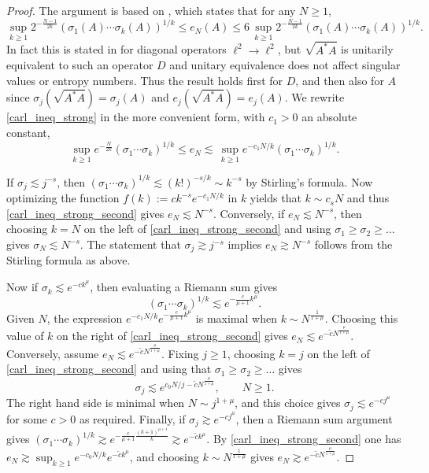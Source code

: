 \documentclass[12pt,twoside]{amsart}
\numberwithin{equation}{section}
\renewcommand{\leq}{\leqslant}
\renewcommand{\geq}{\geqslant}
\begin{document}
\begin{proof}
The argument is based on \cite[Proposition 1.3.2]{CS90}, which states that for any $N \geq 1$, 
\begin{equation} \label{carl_ineq_strong}
\sup_{k \geq 1} 2^{-\frac{N-1}{2k}} (\sigma_1(A) \cdots \sigma_k(A))^{1/k} \leq e_N(A) \leq 6 \,\sup_{k \geq 1} 2^{-\frac{N-1}{2k}} (\sigma_1(A) \cdots \sigma_k(A))^{1/k}.
\end{equation}
In fact this is stated in \cite{CS90} for diagonal operators $\ell^2 \to \ell^2$, but $\sqrt{A^* A}$ is unitarily equivalent to such an operator $D$ and unitary equivalence does not affect singular values or entropy numbers. Thus the result holds first for $D$, and then also for $A$ since $\sigma_j(\sqrt{A^* A}) = \sigma_j(A)$ and $e_j(\sqrt{A^* A}) = e_j(A)$. We rewrite \eqref{carl_ineq_strong} in the more convenient form, with $c_1 > 0$ an absolute constant, 
\begin{equation} \label{carl_ineq_strong_second}
\sup_{k \geq 1}  e^{-\frac{N}{2k}}  (\sigma_1 \cdots \sigma_k)^{1/k} \leq e_N \lesssim \,\sup_{k \geq 1} e^{-c_1 N/k} (\sigma_1 \cdots \sigma_k)^{1/k}.
\end{equation}

If $\sigma_j \lesssim j^{-s}$, then $(\sigma_1 \cdots \sigma_k)^{1/k} \lesssim (k!)^{-s/k} \sim k^{-s}$ by Stirling's formula. Now optimizing the function $f(k):= ck^{-s} e^{-c_1 N/k}$ in $k$ yields that $k \sim c_s N$ and thus \eqref{carl_ineq_strong_second} gives $e_N \lesssim N^{-s}$. Conversely, if $e_N \lesssim N^{-s}$, then choosing $k=N$ on the left of \eqref{carl_ineq_strong_second} and using $\sigma_1 \geq \sigma_2 \geq \ldots$ gives $\sigma_N \lesssim N^{-s}$. The statement that $\sigma_j \gtrsim j^{-s}$ implies $e_N \gtrsim N^{-s}$ follows from the Stirling formula as above.

Now if $\sigma_k \lesssim e^{-ck^{\mu}}$, then evaluating a Riemann sum gives 
\[
(\sigma_1 \cdots \sigma_k)^{1/k} \lesssim e^{-\frac{c}{\mu+1} k^{\mu}}.
\]
Given $N$, the expression $e^{-c_1 N/k} e^{-\frac{c}{\mu+1} k^{\mu}}$ is maximal when $k \sim N^{\frac{1}{1+\mu}}$. Choosing this value of $k$ on the right of \eqref{carl_ineq_strong_second} gives $e_N \lesssim e^{-\tilde{c} N^{\frac{\mu}{1+\mu}}}$. Conversely, assume $e_N \lesssim e^{-\tilde{c} N^{\frac{\mu}{1+\mu}}}$. Fixing $j \geq 1$, choosing $k=j$ on the left of \eqref{carl_ineq_strong_second} and using that $\sigma_1 \geq \sigma_2 \geq \ldots$  gives 
\[
\sigma_j \lesssim e^{c_0 N/j -\tilde{c} N^{\frac{\mu}{1+\mu}}}, \qquad N \geq 1.
\]
The right hand side is minimal when $N \sim j^{1+\mu}$, and this choice gives $\sigma_j \lesssim e^{-c j^{\mu}}$ for some $c > 0$ as required. Finally, if $\sigma_j \gtrsim e^{-cj^{\mu}}$, then a Riemann sum argument gives $(\sigma_1 \cdots \sigma_k)^{1/k} \gtrsim e^{-\frac{c}{\mu+1} \frac{(k+1)^{\mu+1}}{k}} \gtrsim e^{-\tilde{c} k^{\mu}}$. By \eqref{carl_ineq_strong_second} one has $e_N \gtrsim \sup_{k \geq 1} e^{-c_0 N/k} e^{-\tilde{c} k^{\mu}}$, and choosing $k \sim N^{\frac{1}{1+\mu}}$ gives $e_N \gtrsim e^{-\tilde{c} N^{\frac{\mu}{1+\mu}}}$.
\end{proof}
\end{document}
